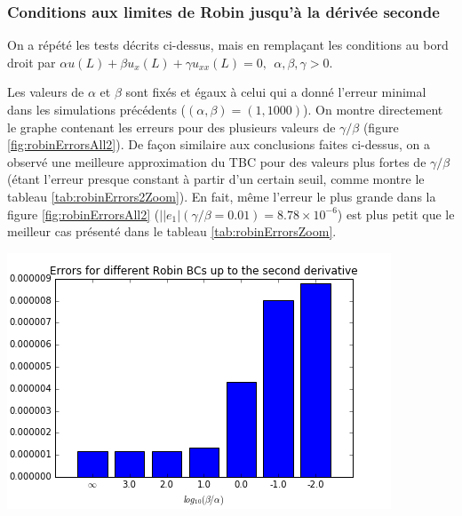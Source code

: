 \subsubsection{Conditions aux limites de Robin jusqu'à la dérivée seconde}

\indent On a répété les tests décrits ci-dessus, mais en remplaçant les conditions au bord droit par $\alpha u(L) + \beta u_x(L) + \gamma u_{xx}(L) = 0,  \ \ \alpha,\beta, \gamma > 0$.

\indent Les valeurs de $\alpha$ et $\beta$ sont fixés et égaux à celui qui a donné l'erreur minimal dans les simulations précédents ($(\alpha,\beta) = (1,1000)$). On montre directement le graphe contenant les erreurs pour des plusieurs valeurs de $\gamma/\beta$ (figure \ref{fig:robinErrorsAll2}). De façon similaire aux conclusions faites ci-dessus, on a observé une meilleure approximation du TBC pour des valeurs plus fortes de $\gamma/\beta$ (étant l'erreur presque constant à partir d'un certain seuil, comme montre le tableau \ref{tab:robinErrors2Zoom}). En fait, même l'erreur le plus grande dans la figure \ref{fig:robinErrorsAll2} ($||e_1|(\gamma/\beta = 0.01) = 8.78 \times 10^{-6}$) est plus petit que le meilleur cas présenté dans le tableau \ref{tab:robinErrorsZoom}.

\begingroup
\begin{center}
		\includegraphics[scale=.6]{figures/robinErrors2.png}
\end{center}
\endgroup

